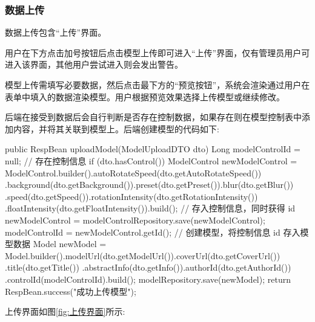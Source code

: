 \subsubsection{数据上传}

数据上传包含``上传''界面。

用户在下方点击加号按钮后点击模型上传即可进入``上传''界面，仅有管理员用户可进入该界面，其他用户尝试进入则会发出警告。

模型上传需填写必要数据，然后点击最下方的``预览按钮''，系统会渲染通过用户在表单中填入的数据渲染模型。用户根据预览效果选择上传模型或继续修改。

后端在接受到数据后会自行判断是否存在控制数据，如果存在则在模型控制表中添加内容，并将其关联到模型上。后端创建模型的代码如下:

\begin{Java}
public RespBean uploadModel(ModelUploadDTO dto) {
    Long modelControlId = null;
    // 存在控制信息
    if (dto.hasControl()) {
        ModelControl newModelControl = ModelControl.builder().autoRotateSpeed(dto.getAutoRotateSpeed())
                .background(dto.getBackground()).preset(dto.getPreset()).blur(dto.getBlur())
                .speed(dto.getSpeed()).rotationIntensity(dto.getRotationIntensity())
                .floatIntensity(dto.getFloatIntensity()).build();
        // 存入控制信息，同时获得 id
        newModelControl = modelControlRepository.save(newModelControl);
        modelControlId = newModelControl.getId();
    }
    // 创建模型，将控制信息 id 存入模型数据
    Model newModel = Model.builder().modelUrl(dto.getModelUrl()).coverUrl(dto.getCoverUrl())
            .title(dto.getTitle())
            .abstractInfo(dto.getInfo()).authorId(dto.getAuthorId())
            .controlId(modelControlId).build();
    modelRepository.save(newModel);
    return RespBean.success("成功上传模型");
}
\end{Java}

上传界面如图\ref{fig:上传界面}所示:

